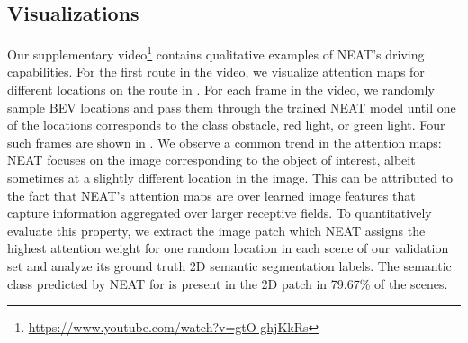 \subsection{Visualizations}
Our supplementary video\footnote{\url{https://www.youtube.com/watch?v=gtO-ghjKkRs}} contains qualitative examples of NEAT's driving capabilities. For the first route in the video, we visualize attention maps  for different locations on the route in . For each frame in the video, we randomly sample BEV  locations and pass them through the trained NEAT model until one of the locations corresponds to the class obstacle, red light, or green light. Four such frames are shown in . We observe a common trend in the attention maps: NEAT focuses on the image corresponding to the object of interest, albeit sometimes at a slightly different location in the image. This can be attributed to the fact that NEAT's attention maps are over learned image features that capture information aggregated over larger receptive fields. To quantitatively evaluate this property, we extract the  image patch which NEAT assigns the highest attention weight for one random  location in each scene of our validation set and analyze its ground truth 2D semantic segmentation labels. The semantic class predicted by NEAT for  is present in the 2D patch in 79.67\% of the scenes.
